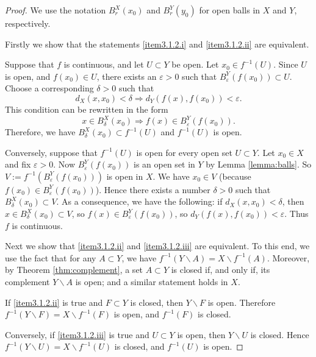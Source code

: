 \begin{proof}
We use the notation $B_r^X(x_0)$ and $B_r^Y(y_0)$ for open balls in $X$ and $Y$, respectively.

Firstly we show that the statements \eqref{item3.1.2.i} and \eqref{item3.1.2.ii} are equivalent.

Suppose that $f$ is continuous, and let $U \subset Y$ be open. Let $x_0 \in f^{-1}(U)$.
Since $U$ is open, and $f(x_0) \in U$, there exists an $\varepsilon > 0$ such that $B_\varepsilon^Y(f(x_0)) \subset U$.
Choose a corresponding $\delta > 0$ such that
\[
d_X(x,x_0) < \delta \Rightarrow d_Y(f(x),f(x_0)) < \varepsilon.
\]
This condition can be rewritten in the form
\[
x \in B_\delta^X(x_0) \Rightarrow f(x) \in B_\varepsilon^Y(f(x_0)).
\]
Therefore, we have $B_\delta^X(x_0) \subset f^{-1}(U)$ and $f^{-1}(U)$ is open.

Conversely, suppose that $f^{-1}(U)$ is open for every open set $U \subset Y$.
Let $x_0 \in X$ and fix $\varepsilon > 0$. Now $B_\varepsilon^Y(f(x_0))$ is an open
set in $Y$ by Lemma \ref{lemma:balls}. So $V := f^{-1}(B_\varepsilon^Y(f(x_0)))$ is open
in $X$. We have $x_0 \in V$ (because $f(x_0) \in B_\varepsilon^Y(f(x_0))$). Hence there
exists a number $\delta > 0$ such that $B_\delta^X(x_0) \subset V$.
As a consequence, we have the following: if $d_X(x,x_0) < \delta$, then
$x \in B_\delta^X(x_0) \subset V$, so $f(x) \in B_\varepsilon^Y(f(x_0))$, so
$d_Y(f(x),f(x_0)) < \varepsilon$. Thus $f$ is continuous.

\np

Next we show that \eqref{item3.1.2.ii} and \eqref{item3.1.2.iii} are equivalent.
\nl
To this end, we use the fact that for any $A \subset Y$, we have $f^{-1}(Y \backslash A) = X \backslash f^{-1}(A)$.
Moreover, by Theorem \ref{thm:complement}, a set $A \subset Y$ is closed if, and only if,
its complement $Y \backslash A$ is open; and a similar statement holds in $X$.

If \eqref{item3.1.2.ii} is true and $F \subset Y$ is closed, then $Y \backslash F$ is open.
Therefore $f^{-1}(Y \backslash F) = X \backslash f^{-1}(F)$ is open, and $f^{-1}(F)$ is closed.

Conversely, if \eqref{item3.1.2.iii} is true and $U \subset Y$ is open, then $Y \backslash U$ is
closed. Hence $f^{-1}(Y \backslash U) = X \backslash f^{-1}(U)$ is closed, and $f^{-1}(U)$ is
open.
\end{proof}


{}

